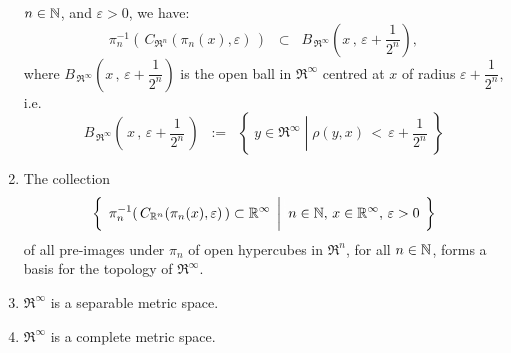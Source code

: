 \begin{theorem}
\begin{enumerate}
		$n \in \mathbb{N}$, and $\varepsilon > 0$, we have:
		\begin{equation*}
		\pi_{n}^{-1}\!\left(\,C_{\Re^{n}}(\pi_{n}(x),\varepsilon)\,\right)
		\;\;\subset\;\;
		B_{\mbox{}\,\Re^{\infty}}\!\left(x\,,\,\varepsilon + \frac{1}{2^{n}}\right),
		\end{equation*}
		where $B_{\mbox{}\,\Re^{\infty}}\!\left(x\,,\,\varepsilon + \dfrac{1}{2^{n}}\right)$
		is the open ball in $\Re^{\infty}$ centred at $x$ of radius $\varepsilon + \dfrac{1}{2^{n}}$, i.e.
		\begin{equation*}
		B_{\mbox{}\,\Re^{\infty}}\!\left(\,x\,,\,\varepsilon + \frac{1}{2^{n}}\,\right)
		\;\; := \;\;
		\left\{\;
		y \in \Re^{\infty}
		\;\left\vert\;
		\rho(y,x) \,<\, \varepsilon + \frac{1}{2^{n}}
		\right.
		\;\right\}
		\end{equation*}
\item	\label{FiniteDimensionalSetsFormBasisInRInfinity}The collection
		\begin{equation*}
		\left\{\;\,
		\pi_{n}^{-1}\!\left(\,C_{\Re^{n}}(\pi_{n}(x),\varepsilon)\,\right) \subset \Re^{\infty}
		\;\left\vert
		{\color{white}\overset{1}{1}}
		n \in \N,\,x \in \Re^{\infty},\,\varepsilon > 0
		\right.
		\;\right\}
		\end{equation*}
		of all pre-images under $\pi_{n}$ of open hypercubes in $\Re^{n}$, for all $n \in \mathbb{N}$,
		forms a basis for the topology of $\Re^{\infty}$.
\item	\label{RInfinitySeparable}$\Re^{\infty}$ is a separable metric space.
\item	\label{RInfinityComplete}$\Re^{\infty}$ is a complete metric space.
\end{enumerate}
\end{theorem}

